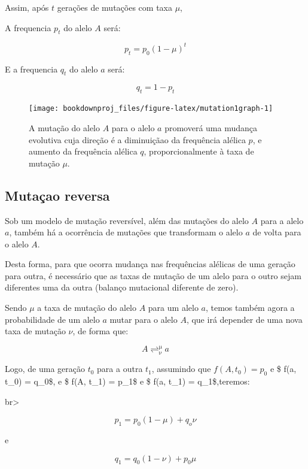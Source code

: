 \documentclass[
]{book}
\begin{document}
Assim, após \(t\) gerações de mutações com taxa \(\mu\),

A frequencia \(p_t\) do alelo \(A\) será:

\[ p_t = p_0 \left( 1 - \mu \right)^t \]

E a frequencia \(q_t\) do alelo \(a\) será:

\[ q_t = 1 - p_t\]

\begin{figure}

{\centering \texttt{[image: bookdownproj\_files/figure-latex/mutation1graph-1]} 

}

\caption{A mutação do alelo $A$ para o alelo $a$ promoverá uma mudança evolutiva cuja direção é a diminuiçãao da frequência alélica $p$, e aumento da frequência alélica $q$,  proporcionalmente à taxa de mutação $μ$.}\label{fig:mutation1graph}
\end{figure}

\hypertarget{mutauxe7ao-reversa}{%
\subsection{Mutaçao reversa}\label{mutauxe7ao-reversa}}

Sob um modelo de mutação reversível, além das mutações do alelo \(A\) para a alelo \(a\), também há a ocorrência de mutações que transformam o alelo \(a\) de volta para o alelo \(A\).

Desta forma, para que ocorra mudança nas frequências alélicas de uma geração para outra, é necessário que as taxas de mutação de um alelo para o outro sejam diferentes uma da outra (balanço mutacional diferente de zero).

Sendo \(\mu\) a taxa de mutação do alelo \(A\) para um alelo \(a\), temos também agora a probabilidade de um alelo \(a\) mutar para o alelo \(A\), que irá depender de uma nova taxa de mutação \(\nu\), de forma que:

\[A \mathrel{\mathop{\rightleftharpoons}^{\mathrm{\mu}}_{\mathrm{\nu}}} a\]

Logo, de uma geração \(t_0\) para a outra \(t_1\), assumindo que \(f(A, t_0) = p_0\) e \$ f(a, t\_0) = q\_0\$, e \$ f(A, t\_1) = p\_1\$ e \$ f(a, t\_1) = q\_1\$,teremos:

br\textgreater{}

\[ p_1 = p_0(1- \mu) + q_o \nu\]

e

\[ q_1 = q_0(1- \nu) + p_0 \mu\]
\end{document}

